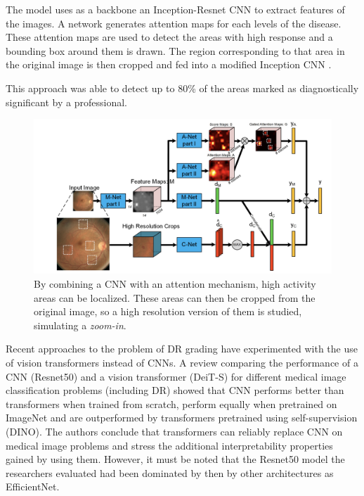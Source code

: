 The model uses as a backbone an Inception-Resnet CNN to extract features of the images. A network generates attention maps for each levels of the disease. These attention maps are used to detect the areas with high response and a bounding box around them is drawn. The region corresponding to that area in the original image is then cropped and fed into a modified Inception CNN \cite{szegedy2016rethinking}.

This approach was able to detect up to 80\% of the areas marked as diagnostically significant by a professional.

\begin{figure}[tb]
    \centering
    \includegraphics[width=\textwidth]{figures/chapter3/zoom_in.png}
    \caption{By combining a CNN with an attention mechanism, high activity areas can be localized. These areas can then be cropped from the original image, so a high resolution version of them is studied, simulating a \textit{zoom-in}\cite{wang2017zoom}.}
    \label{fig:zoom_in}
\end{figure}

Recent approaches to the problem of DR grading have experimented with the use of vision transformers instead of CNNs. A review comparing the performance of a CNN (Resnet50) and a vision transformer (DeiT-S) for different medical image classification problems (including DR) showed that CNN performs better than transformers when trained from scratch, perform equally when pretrained on ImageNet and are outperformed by transformers pretrained using self-supervision (DINO)\cite{matsoukas2021time}. The authors conclude that transformers can reliably replace CNN on medical image problems and stress the additional interpretability properties gained by using them. However, it must be noted that the Resnet50 model the researchers evaluated had been dominated by then by other architectures as EfficientNet.

